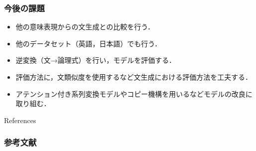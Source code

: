 \documentclass[dvipdfmx]{beamer}
\begin{document}
\begin{frame}
\frametitle{今後の課題}
\begin{itemize}
\item 他の意味表現からの文生成との比較を行う．
\item 他のデータセット（英語，日本語）でも行う．
\item 逆変換（文→論理式）を行い，モデルを評価する．
\item 評価方法に，文類似度を使用するなど文生成における評価方法を工夫する．
\item アテンション付き系列変換モデルやコピー機構を用いるなどモデルの改良に取り組む．

\end{itemize}

\end{frame}


\begin{frame}[allowframebreaks]{References}{} %
\frametitle{参考文献}
\fontsize{9pt}{0pt}\selectfont %


\nocite{*}
\fontsize{12pt}{0pt}\selectfont %
\end{frame}


\end{document}
